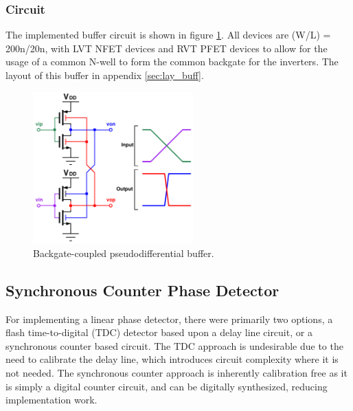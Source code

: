 		\subsubsection{Circuit}
		The implemented buffer circuit is shown in figure \ref{fig:pd_buffer_circuit}. All devices are (W/L) = 200n/20n, with LVT NFET devices and RVT PFET devices to allow for the usage of a common N-well to form the common backgate for the inverters. The layout of this buffer in appendix \ref{sec:lay_buff}.
			\begin{figure}[htb!]
			        \centering
			        \includegraphics[width=0.55\textwidth, angle=0]{./figs/design/pseudiff_buffer}
			    \caption{Backgate-coupled pseudodifferential buffer.}
			    \label{fig:pd_buffer_circuit}
			\end{figure}



	\FloatBarrier
	\subsection{Synchronous Counter Phase Detector}
	For implementing a linear phase detector, there were primarily two options, a flash time-to-digital (TDC) detector based upon a delay line circuit, or a synchronous counter based circuit. The TDC approach is undesirable due to the need to calibrate the delay line, which introduces circuit complexity where it is not needed. The synchronous counter approach is inherently calibration free as it is simply a digital counter circuit, and can be digitally synthesized, reducing implementation work. 


